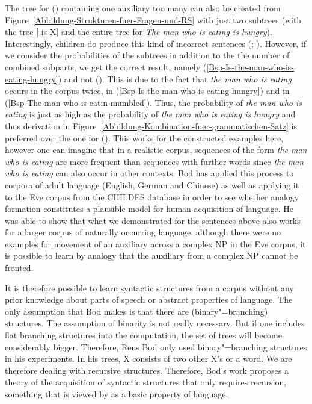 The tree for () containing one auxiliary too many can also be created from Figure~\ref{Abbildung-Strukturen-fuer-Fragen-und-RS} with just two subtrees 
(with the tree [ is X] and the entire tree for \emph{The man who is eating is hungry}).
\z
Interestingly, children do produce this kind of incorrect sentences (\citealp[]{CN87a-u}; \citealp*{ARP2008a}). 
However, if we consider the probabilities of the subtrees in addition to the the number of combined
subparts, we get the correct result, namely (\ref{Bsp-Is-the-man-who-is-eating-hungry}) and not ().
This is due to the fact that \emph{the man who is eating} occurs in the corpus twice, in (\ref{Bsp-Is-the-man-who-is-eating-hungry}) and in
(\ref{Bsp-The-man-who-is-eatin-mumbled}).
Thus, the probability of \emph{the man who
  is eating} is just as high as the probability of \emph{the man who is eating is hungry} and thus derivation in Figure~\ref{Abbildung-Kombination-fuer-grammatischen-Satz} 
  is preferred over the one for ().
This works for the constructed examples here, however one can imagine that in a realistic corpus, sequences of the form \emph{the man who is eating} are more frequent
than sequences with further words since \emph{the man who is eating} can also occur in other contexts.
Bod has applied this process to corpora of adult language (English, German and Chinese) as well as
applying it to the Eve corpus from the CHILDES database in order to see whether analogy formation constitutes a plausible model
for human acquisition of language. He was able to show that what we demonstrated for
the sentences above also works for a larger corpus of
naturally occurring language: although there were no examples for movement of an auxiliary across a complex NP in the Eve corpus, it is possible to learn
by analogy that the auxiliary from a complex NP cannot be fronted.

It is therefore possible to learn syntactic structures from a corpus without any prior knowledge
about parts of speech or abstract properties of language.
The only assumption that Bod makes is that there are (binary"=branching) structures. The assumption of binarity is not really
necessary. But if one includes flat branching structures into the computation, the set of trees will
become considerably bigger. Therefore, Rens Bod only used binary"=branching structures in his
experiments. In his trees, X consists of two other X's or a word. We are therefore dealing with
recursive structures. Therefore, Bod's work proposes a theory of the acquisition of
syntactic structures that only requires recursion, something that is viewed by \citet*{HCF2002a} as a basic property of language.

